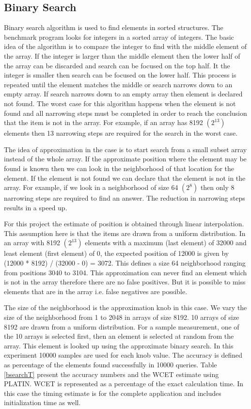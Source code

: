 \subsection{Binary Search}
Binary search algorithm is used to find elements in sorted structures. The benchmark program looks for integers in a sorted array of integers. The basic idea of the algorithm is to compare the integer to find with the middle element of the array. If the integer is larger than the middle element then the lower half of the array can be discarded and search can be focused on the top half. It the integer is smaller then search can be focused on the lower half. This process is repeated until the element matches the middle or search narrows down to an empty array. If search narrows down to an empty array then element is declared not found. The worst case for this algorithm happens when the element is not found and all narrowing steps must be completed in order to reach the conclusion that the item is not in the array. For example, if an array has 8192 $(2^{13})$ elements then 13 narrowing steps are required for the search in the worst case.

The idea of approximation in the case is to start search from a small subset array instead of the whole array. If the approximate position where the element may be found is known then we can look in the neighborhood of that location for the element. If the element is not found we can declare that the element is not in the array. For example, if we look in a neighborhood of size 64 $(2^{8})$ then only 8 narrowing steps are required to find an answer. The reduction in narrowing steps results in a speed up.

For this project the estimate of position is obtained through linear interpolation. This assumption here is that the items are drawn from a uniform distribution. In an array with 8192 $(2^{13})$ elements with a maximum (last element) of 32000 and least element (first element) of 0, the expected position of 12000 is given by (12000 * 8192) / (32000 - 0) = 3072. This defines a size 64 neighborhood ranging from positions 3040 to 3104. This approximation can never find an element which is not in the array therefore there are no false positives. But it is possible to miss elements that are in the array i.e. false negatives are possible.

The size of the neighborhood is the approximation knob in this case. We vary the size of the neighborhood from 1 to 2048 in arrays of size 8192. 10 arrays of size 8192 are drawn from a uniform distribution. For a sample measurement, one of the 10 arrays is selected first, then an element is selected at random from the array. This element is looked up using the approximate binary search. In this experiment 10000 samples are used for each knob value. The accuracy is defined as percentage of the elements found successfully in 10000 queries. Table \ref{bsearchT} present the accuracy numbers and the WCET estimate using PLATIN. WCET is represented as a percentage of the exact calculation time. In this case the timing estimate is for the complete application and includes initialization time as well.

